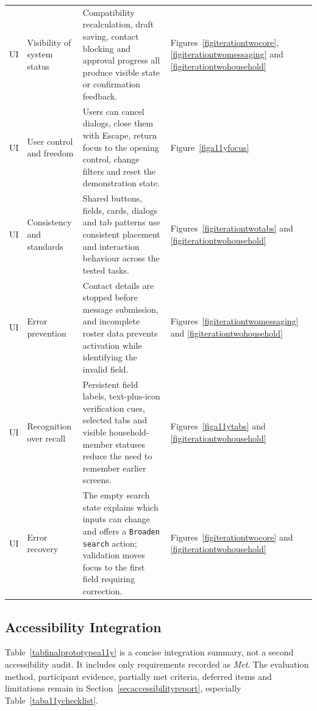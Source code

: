 \documentclass[11pt,a4paper]{article}
\begin{document}
{\begin{longtable}{@{}L{1.8cm}L{2.7cm}L{7.2cm}L{2.7cm}@{}}
    UI & Visibility of system status &
    Compatibility recalculation, draft saving, contact blocking and approval
    progress all produce visible state or confirmation feedback. &
    Figures~\ref{figiterationtwocore}, \ref{figiterationtwomessaging} and
    \ref{figiterationtwohousehold}\\

    UI & User control and freedom &
    Users can cancel dialogs, close them with Escape, return focus to the
    opening control, change filters and reset the demonstration state. &
    Figure~\ref{figa11yfocus}\\

    UI & Consistency and standards &
    Shared buttons, fields, cards, dialogs and tab patterns use consistent
    placement and interaction behaviour across the tested tasks. &
    Figures~\ref{figiterationtwotabs} and \ref{figiterationtwohousehold}\\

    UI & Error prevention &
    Contact details are stopped before message submission, and incomplete
    roster data prevents activation while identifying the invalid field. &
    Figures~\ref{figiterationtwomessaging} and
    \ref{figiterationtwohousehold}\\

    UI & Recognition over recall &
    Persistent field labels, text-plus-icon verification cues, selected tabs
    and visible household-member statuses reduce the need to remember earlier
    screens. & Figures~\ref{figa11ytabs} and
    \ref{figiterationtwohousehold}\\

    UI & Error recovery &
    The empty search state explains which inputs can change and offers a
    \texttt{Broaden search} action; validation moves focus to the first field
    requiring correction. & Figures~\ref{figiterationtwocore} and
    \ref{figiterationtwohousehold}\\
\end{longtable}
}

\subsection{Accessibility Integration}
\label{subsecfinalprototypeaccessibility}

Table~\ref{tabfinalprototypea11y} is a concise integration summary, not a
second accessibility audit. It includes only requirements recorded as
\textit{Met}. The evaluation method, participant evidence, partially met
criteria, deferred items and limitations remain in
Section~\ref{secaccessibilityreport}, especially
Table~\ref{taba11ychecklist}.
\end{document}
